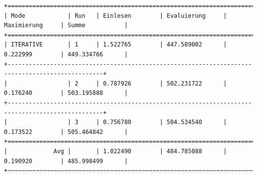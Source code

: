 \documentclass[draft,final]{vutinfth} %
\begin{document}
\begin{lstlisting}[float,basicstyle=\tiny,caption={Benchmark ITERATIVE, Datei: lubm-ex-20-17.sparql.xml},label={lst:bi17raw}]
+=================================================================================================+
| Mode            | Run   | Einlesen        | Evaluierung     | Maximierung     | Summe           | 
+=================================================================================================+
| ITERATIVE       | 1     | 1.522765        | 447.589002      | 0.222999        | 449.334766      | 
+-------------------------------------------------------------------------------------------------+
|                 | 2     | 0.787926        | 502.231722      | 0.176240        | 503.195888      | 
+-------------------------------------------------------------------------------------------------+
|                 | 3     | 0.756780        | 504.534540      | 0.173522        | 505.464842      | 
+=================================================================================================+
|             Avg |       | 1.022490        | 484.785088      | 0.190920        | 485.998499      |
+~~~~~~~~~~~~~~~~~~~~~~~~~~~~~~~~~~~~~~~~~~~~~~~~~~~~~~~~~~~~~~~~~~~~~~~~~~~~~~~~~~~~~~~~~~~~~~~~~+
\end{lstlisting}
\end{document}

